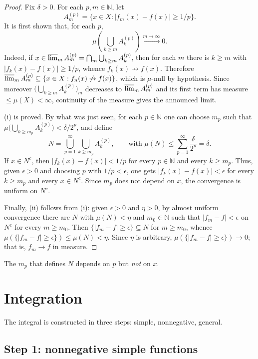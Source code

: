 \documentclass[11pt, a4paper]{article}
\begin{document}
\begin{proof}
Fix $\delta > 0$. For each $p, m \in \mathbb{N}$, let
$$ A_m^{(p)} = \{x \in X : |f_m(x) - f(x)| \ge 1/p\}. $$
It is first shown that, for each $p$,
$$ \mu\!\left(\bigcup_{k \ge m} A_k^{(p)}\right) \xrightarrow{m \to \infty} 0. $$
Indeed, if $x \in \varlimsup_m A_m^{(p)} = \bigcap_m \bigcup_{k \ge m} A_k^{(p)}$, then for
each $m$ there is $k \ge m$ with $|f_k(x) - f(x)| \ge 1/p$, whence $f_k(x) \not\to f(x)$.
Therefore $\varlimsup_m A_m^{(p)} \subseteq \{x \in X : f_n(x) \not\to f(x)\}$, which is $\mu$-null by
hypothesis. Since moreover $\big(\bigcup_{k \ge m} A_k^{(p)}\big)_m$ decreases to
$\varlimsup_m A_m^{(p)}$ and its first term has measure $\le \mu(X) < \infty$, continuity of
the measure gives the announced limit.

(i) is proved. By what was just seen, for each $p \in
\mathbb{N}$ one can choose $m_p$ such that $\mu\big(\bigcup_{k \ge m_p} A_k^{(p)}\big) < \delta/2^p$, and
define
$$ N = \bigcup_{p=1}^\infty \bigcup_{k \ge m_p} A_k^{(p)}, \qquad \text{with } \mu(N) \le
\sum_{p=1}^\infty \frac{\delta}{2^p} = \delta. $$
If $x \in N^c$, then $|f_k(x) - f(x)| < 1/p$ for every $p \in \mathbb{N}$ and every $k \ge m_p$.
Thus, given $\epsilon > 0$ and choosing $p$ with $1/p < \epsilon$, one gets $|f_k(x) - f(x)| < \epsilon$
for every $k \ge m_p$ and every $x \in N^c$. Since $m_p$ does not depend on $x$, the convergence is uniform
on $N^c$.

Finally, (ii) follows from (i): given $\epsilon > 0$ and $\eta > 0$, by almost uniform
convergence there are $N$ with $\mu(N) < \eta$ and $m_0 \in \mathbb{N}$ such that $|f_m - f| < \epsilon$ on
$N^c$ for every $m \ge m_0$. Then $\{|f_m - f| \ge \epsilon\} \subseteq N$ for $m \ge m_0$,
whence $\mu(\{|f_m - f| \ge \epsilon\}) \le \mu(N) < \eta$. Since $\eta$ is arbitrary,
$\mu(\{|f_m - f| \ge \epsilon\}) \to 0$; that is, $f_m \to f$ in measure.
\end{proof}

\obs The $m_p$ that defines $N$ depends on $p$ but \emph{not} on $x$.

\newpage

\section{Integration}

The integral is constructed in three steps: simple, nonnegative, general.

\subsection{Step 1: nonnegative simple functions}
\end{document}
